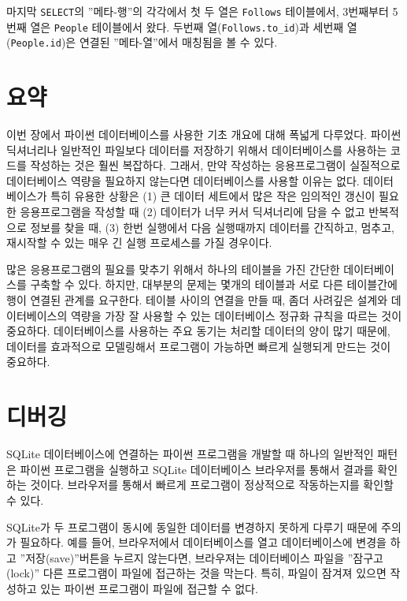 마지막 {\tt SELECT}의 ''메타-행''의 각각에서 첫 두 열은 {\tt Follows} 테이블에서, 3번째부터 5번째 열은 {\tt People}
테이블에서 왔다. 두번째 열(\verb"Follows.to_id")과 세번째 열({\tt People.id})은 연결된 ''메타-열''에서 매칭됨을 볼 수 있다.

\section{요약}

이번 장에서 파이썬 데이터베이스를 사용한 기초 개요에 대해 폭넓게 다루었다.
파이썬 딕셔너리나 일반적인 파일보다 데이터를 저장하기 위해서 데이터베이스를 사용하는 코드를 작성하는 것은 훨씬 복잡하다.
그래서, 만약 작성하는 응용프로그램이 실질적으로 데이터베이스 역량을 필요하지 않는다면 데이터베이스를 사용할 이유는 없다.
데이터베이스가 특히 유용한 상황은 (1) 큰 데이터 세트에서 많은 작은 임의적인 갱신이 필요한 응용프로그램을 작성할 때
(2) 데이터가 너무 커서 딕셔너리에 담을 수 없고 반복적으로 정보를 찾을 때, (3) 한번 실행에서 다음 실행때까지 데이터를 
간직하고, 멈추고, 재시작할 수 있는 매우 긴 실행 프로세스를 가질 경우이다.

많은 응용프로그램의 필요를 맞추기 위해서 하나의 테이블을 가진 간단한 데이터베이스를 구축할 수 있다.
하지만, 대부분의 문제는 몇개의 테이블과 서로 다른 테이블간에 행이 연결된 관계를 요구한다.
테이블 사이의 연결을 만들 때, 좀더 사려깊은 설계와 데이터베이스의 역량을 가장 잘 사용할 수 있는 데이터베이스 정규화 규칙을
따르는 것이 중요하다. 데이터베이스를 사용하는 주요 동기는 처리할 데이터의 양이 많기 때문에, 
데이터를 효과적으로 모델링해서 프로그램이 가능하면 빠르게 실행되게 만드는 것이 중요하다.

\section{디버깅}

SQLite 데이터베이스에 연결하는 파이썬 프로그램을 개발할 때 하나의 일반적인 패턴은
파이썬 프로그램을 실행하고 SQLite 데이터베이스 브라우저를 통해서 결과를 확인하는 것이다.
브라우저를 통해서 빠르게 프로그램이 정상적으로 작동하는지를 확인할 수 있다.

SQLite가 두 프로그램이 동시에 동일한 데이터를 변경하지 못하게 다루기 때문에 주의가 필요하다.
예를 들어, 브라우저에서 데이터베이스를 열고 데이터베이스에 변경을 하고 ''저장(save)''버튼을 누르지 않는다면,
브라우져는 데이터베이스 파일을 ''잠구고(lock)'' 다른 프로그램이 파일에 접근하는 것을 막는다.
특히, 파일이 잠겨져 있으면 작성하고 있는 파이썬 프로그램이 파일에 접근할 수 없다.

